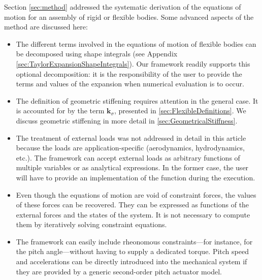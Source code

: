 \documentclass[wes, manuscript]{copernicus}
\renewcommand{\v}[1]{\boldsymbol{#1}}
\begin{document}
Section \ref{sec:method} addressed the systematic derivation of the equations of motion for an assembly of rigid or flexible bodies.
    Some advanced aspects of the method are discussed here:
\begin{itemize}
    \item
The different terms involved in the equations of motion of flexible bodies can be decomposed using shape integrals (see Appendix \ref{sec:TaylorExpansionShapeIntegrals}).
% 
Our framework readily supports this optional decomposition: it is the responsibility of the user to provide the terms and values of the expansion when numerical evaluation is to occur.

    \item The definition of geometric stiffening requires attention in the general case.
    It is accounted for by the term $\v{k}_\sigma$, presented in \autoref{sec:FlexibleDefinitions}.
    We discuss geometric stiffening in more detail in \autoref{sec:GeometricalStiffness}.

    \item The treatment of external loads was not addressed in detail in this article because the loads are application-specific (aerodynamics, hydrodynamics, etc.).
    The framework can accept external loads as arbitrary functions of multiple variables or as analytical expressions.
    In the former case, the user will have to provide an implementation of the function during the execution.

    \item Even though the equations of motion are void of constraint forces, the values of these forces can be recovered.
    They can be expressed as functions of the external forces and the states of the system.
    It is not necessary to compute them by iteratively solving constraint equations.

    \item The framework can easily include rheonomous constraints---for instance, for the pitch angle---without having to supply a dedicated torque.
    Pitch speed and accelerations can be directly introduced into the mechanical system if they are provided by a generic second-order pitch actuator model.
\end{itemize}
\end{document}
